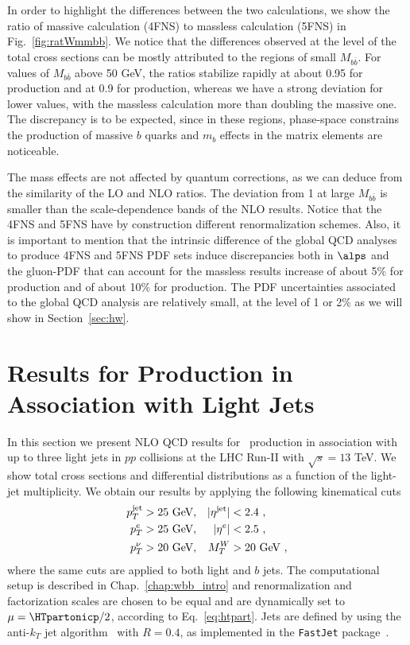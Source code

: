 In order to highlight the
differences between the two calculations, we show the ratio of massive
calculation (4FNS) to massless calculation (5FNS) in Fig.~\ref{fig:ratWmmbb}. We notice that the differences observed at the level of the total cross
sections can be mostly attributed to the regions of small $M_{b\bar
  b}$. For values of $M_{b\bar b}$ above 50 GeV, the ratios stabilize rapidly at about
0.95 for \Wbb{} production and at 0.9 for \Wbbnj[1]{} production, whereas
we have a strong deviation for lower values, with the massless
calculation more than doubling the massive one.  The discrepancy is to
be expected, since in these regions,  phase-space constrains the production of massive $b$ quarks and $m_b$
 effects in the matrix elements are noticeable.


 The mass effects are not affected by
quantum corrections, as we can deduce from the similarity of the LO and NLO
ratios. The deviation from 1 at large $M_{b\bar b}$ is smaller than
the scale-dependence bands of the NLO results. Notice that the 4FNS and 5FNS have by
construction different renormalization schemes. Also, it is important
to mention that the intrinsic difference of the global QCD analyses to produce
4FNS and 5FNS PDF sets induce discrepancies both in $\alps$ and the gluon-PDF
that can account for the massless results increase of about 5\% for \Wbb{}
production and of about 10\% for \Wbbnj[1]{} production. The PDF uncertainties
associated to the global QCD analysis are relatively small, at the level of 1 or 2\%
as we will show in Section~\ref{sec:hw}.



\section{Results for \Wbb{} Production in Association with Light Jets}
\label{sec:vjets}
In this section we present NLO QCD results for \Wbb~production in
association with up to three light jets in
$pp$ collisions at the LHC Run-II with $\sqrt{s}=13$ TeV. We show total cross sections and differential distributions as a function of the light-jet multiplicity. We obtain our results by applying the following kinematical cuts
\begin{align}
  p_T^{\text{jet}}&>25\text{ GeV},& |\eta^{\text{jet}}|&<2.4\ ,\notag\\
  p_T^{e}&>25\text{ GeV},& |\eta^{e}|&<2.5\ ,\notag\\
  p_T^{\nu}&>20\text{ GeV},& M_T^W &> 20\text{ GeV}\ ,
  \label{eq:Cuts}
\end{align}
where the same cuts are applied to both light and
$b$ jets. The computational setup is described in Chap.~\ref{chap:wbb_intro} and renormalization and factorization scales are chosen to be equal and are dynamically set to $\mu=\HTpartonicp/2$, according to
Eq.~\eqref{eq:htpart}. Jets are defined by using the
anti-$k_T$ jet algorithm~\cite{antikT} with $R=0.4$, as implemented in the
\texttt{FastJet} package~\cite{Cacciari:2011ma}.

